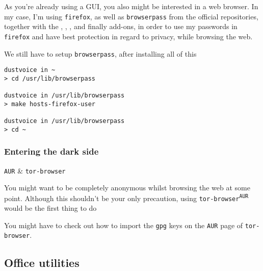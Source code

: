 \documentclass[10pt]{dustdoc}
\begin{document}
As you’re already using a GUI, you also might be interested in a web browser.
In my case, I’m using \texttt{firefox}, as well as \texttt{browserpass} from the official repositories, together with the , , ,  and finally  add-ons, in order to use my passwords in \texttt{firefox} and have best protection in regard to privacy, while browsing the web.

We still have to setup \texttt{browserpass}, after installing all of this

\begin{verbatim}
dustvoice in ~
> cd /usr/lib/browserpass

dustvoice in /usr/lib/browserpass
> make hosts-firefox-user

dustvoice in /usr/lib/browserpass
> cd ~
\end{verbatim}


\subsubsection{Entering the dark side}%
\label{sec:entering-the-dark-side}

\begin{pkgtable}
    \texttt{AUR} & \texttt{tor-browser} \\
\end{pkgtable}

You might want to be completely anonymous whilst browsing the web at some point.
Although this shouldn’t be your only precaution, using \texttt{tor-browser\textsuperscript{\texttt{AUR}}} would be the first thing to do

\begin{NOTE}
    You might have to check out how to import the \texttt{gpg} keys on the \texttt{AUR} page of \texttt{tor-browser}.
\end{NOTE}

\subsection{Office utilities}%
\label{sec:office-utilities}
\end{document}
